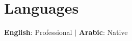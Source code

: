 \documentclass[letterpaper,11pt]{article}
\begin{document}

\section{Languages}
 \begin{itemize}[leftmargin=0.15in, label={}]
    \small{\item{
     \textbf{English}{: Professional} \quad $|$ \quad \textbf{Arabic}{: Native}
    }}
 \end{itemize}

\end{document}
